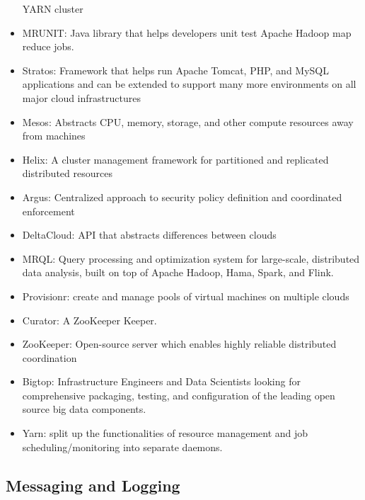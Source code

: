 \documentclass[12pt]{report}
\begin{document}
\begin{itemize}
  YARN cluster
\item
  MRUNIT: Java library that helps developers unit test Apache Hadoop map
  reduce jobs.
\item
  Stratos: Framework that helps run Apache Tomcat, PHP, and MySQL
  applications and can be extended to support many more environments on
  all major cloud infrastructures
\item
  Mesos: Abstracts CPU, memory, storage, and other compute resources
  away from machines
\item
  Helix: A cluster management framework for partitioned and replicated
  distributed resources
\item
  Argus: Centralized approach to security policy definition and
  coordinated enforcement
\item
  DeltaCloud: API that abstracts differences between clouds
\item
  MRQL: Query processing and optimization system for large-scale,
  distributed data analysis, built on top of Apache Hadoop, Hama, Spark,
  and Flink.
\item
  Provisionr: create and manage pools of virtual machines on multiple
  clouds
\item
  Curator: A ZooKeeper Keeper.
\item
  ZooKeeper: Open-source server which enables highly reliable
  distributed coordination
\item
  Bigtop: Infrastructure Engineers and Data Scientists looking for
  comprehensive packaging, testing, and configuration of the leading
  open source big data components.
\item
  Yarn: split up the functionalities of resource management and job
  scheduling/monitoring into separate daemons.
\end{itemize}

\subsection{Messaging and Logging}\label{messaging-and-logging}
\end{document}

